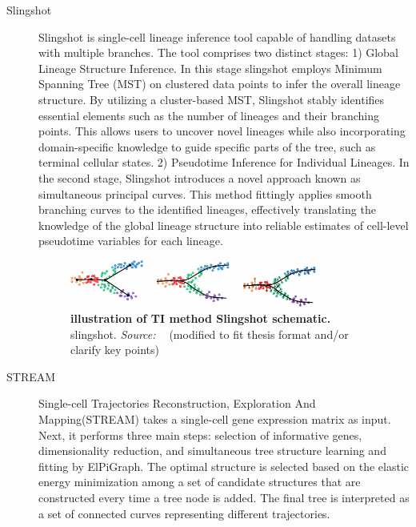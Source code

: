 \begin{description}
    \item[Slingshot]
    Slingshot is single-cell lineage inference tool capable of handling datasets with multiple branches\citep{street2018slingshot}. The tool comprises two distinct stages: 1) Global Lineage Structure Inference. In this stage slingshot employs Minimum Spanning Tree (MST) on clustered data points to infer the overall lineage structure. By utilizing a cluster-based MST, Slingshot stably identifies essential elements such as the number of lineages and their branching points. This allows users to uncover novel lineages while also incorporating domain-specific knowledge to guide specific parts of the tree, such as terminal cellular states. 2) Pseudotime Inference for Individual Lineages. In the second stage, Slingshot introduces a novel approach known as simultaneous principal curves. This method fittingly applies smooth branching curves to the identified lineages, effectively translating the knowledge of the global lineage structure into reliable estimates of cell-level pseudotime variables for each lineage.
    \begin{figure}[ht!]
    	\centering
    	\includegraphics[width=0.8\textwidth]{TI_Alg_slingshot/fig}
    	\vspace{0.1cm}
    	\caption[Illustration of TI method Slingshot schematic.]{\textbf{illustration of TI method Slingshot schematic.}
    	slingshot. \emph{Source: ~\cite{street2018slingshot}} (modified to fit thesis format and/or clarify key points)
    	}
    	\label{fig:TI_Alg_slingshot}
    \end{figure}

    \item[STREAM]
    Single-cell Trajectories Reconstruction, Exploration And Mapping(STREAM) takes a single-cell gene expression matrix as input\citep{chen2019stream}. Next, it performs three main steps: selection of informative genes, dimensionality reduction, and simultaneous tree structure learning and fitting by ElPiGraph. The optimal structure is selected based on the elastic energy minimization among a set of candidate structures that are constructed every time a tree node is added. The final tree is interpreted as a set of connected curves representing different trajectories. 
    

\end{description}
